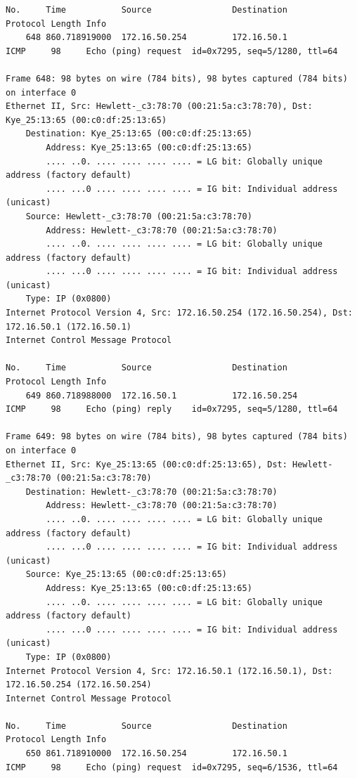 \documentclass[a4paper,11pt]{article}
\begin{document}
\begin{lstlisting}
No.     Time           Source                Destination           Protocol Length Info
    648 860.718919000  172.16.50.254         172.16.50.1           ICMP     98     Echo (ping) request  id=0x7295, seq=5/1280, ttl=64

Frame 648: 98 bytes on wire (784 bits), 98 bytes captured (784 bits) on interface 0
Ethernet II, Src: Hewlett-_c3:78:70 (00:21:5a:c3:78:70), Dst: Kye_25:13:65 (00:c0:df:25:13:65)
    Destination: Kye_25:13:65 (00:c0:df:25:13:65)
        Address: Kye_25:13:65 (00:c0:df:25:13:65)
        .... ..0. .... .... .... .... = LG bit: Globally unique address (factory default)
        .... ...0 .... .... .... .... = IG bit: Individual address (unicast)
    Source: Hewlett-_c3:78:70 (00:21:5a:c3:78:70)
        Address: Hewlett-_c3:78:70 (00:21:5a:c3:78:70)
        .... ..0. .... .... .... .... = LG bit: Globally unique address (factory default)
        .... ...0 .... .... .... .... = IG bit: Individual address (unicast)
    Type: IP (0x0800)
Internet Protocol Version 4, Src: 172.16.50.254 (172.16.50.254), Dst: 172.16.50.1 (172.16.50.1)
Internet Control Message Protocol

No.     Time           Source                Destination           Protocol Length Info
    649 860.718988000  172.16.50.1           172.16.50.254         ICMP     98     Echo (ping) reply    id=0x7295, seq=5/1280, ttl=64

Frame 649: 98 bytes on wire (784 bits), 98 bytes captured (784 bits) on interface 0
Ethernet II, Src: Kye_25:13:65 (00:c0:df:25:13:65), Dst: Hewlett-_c3:78:70 (00:21:5a:c3:78:70)
    Destination: Hewlett-_c3:78:70 (00:21:5a:c3:78:70)
        Address: Hewlett-_c3:78:70 (00:21:5a:c3:78:70)
        .... ..0. .... .... .... .... = LG bit: Globally unique address (factory default)
        .... ...0 .... .... .... .... = IG bit: Individual address (unicast)
    Source: Kye_25:13:65 (00:c0:df:25:13:65)
        Address: Kye_25:13:65 (00:c0:df:25:13:65)
        .... ..0. .... .... .... .... = LG bit: Globally unique address (factory default)
        .... ...0 .... .... .... .... = IG bit: Individual address (unicast)
    Type: IP (0x0800)
Internet Protocol Version 4, Src: 172.16.50.1 (172.16.50.1), Dst: 172.16.50.254 (172.16.50.254)
Internet Control Message Protocol

No.     Time           Source                Destination           Protocol Length Info
    650 861.718910000  172.16.50.254         172.16.50.1           ICMP     98     Echo (ping) request  id=0x7295, seq=6/1536, ttl=64


\end{lstlisting}
\end{document}
